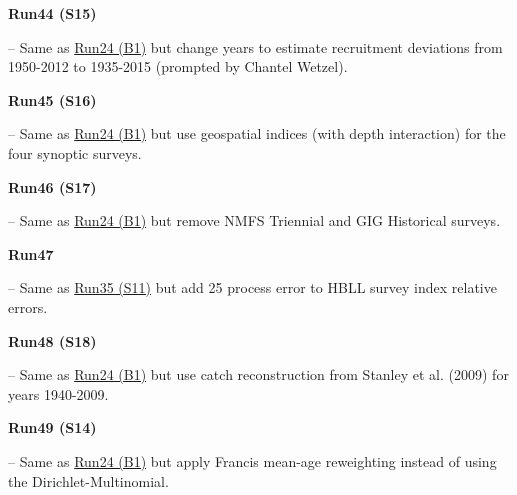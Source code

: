 \hypertarget{R44}{\textbf{Run44 (S15)}} -- Same as \hyperlink{R24}{Run24 (B1)} but change years to estimate recruitment deviations from 1950-2012 to 1935-2015 (prompted by Chantel Wetzel).

\hypertarget{R45}{\textbf{Run45 (S16)}} -- Same as \hyperlink{R24}{Run24 (B1)} but use geospatial indices (with depth interaction) for the four synoptic surveys.

\hypertarget{R46}{\textbf{Run46 (S17)}} -- Same as \hyperlink{R24}{Run24 (B1)} but remove NMFS Triennial and GIG Historical surveys.

\hypertarget{R47}{\textbf{Run47}} -- Same as \hyperlink{R35}{Run35 (S11)} but add 25\pc{} process error to HBLL survey index relative errors.

\hypertarget{R48}{\textbf{Run48 (S18)}} -- Same as \hyperlink{R24}{Run24 (B1)} but use catch reconstruction from Stanley et al. (2009) for years 1940-2009.

\hypertarget{R49}{\textbf{Run49 (S14)}} -- Same as \hyperlink{R24}{Run24 (B1)} but apply Francis mean-age reweighting instead of using the Dirichlet-Multinomial.
